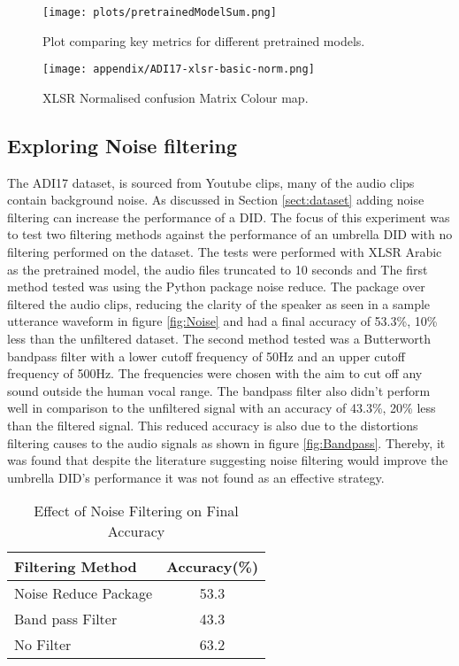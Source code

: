     \begin{figure}[h!]
        \centering
        \texttt{[image: plots/pretrainedModelSum.png]}
        \caption{Plot comparing key metrics for different pretrained models.}
        \label{fig:pretrainsum}
    \end{figure}

    \begin{figure}[h!]
        \centering
        \texttt{[image: appendix/ADI17-xlsr-basic-norm.png]}
        \caption{XLSR Normalised confusion Matrix Colour map.}
        \label{fig:xlsrcolourmap}
    \end{figure}

\pagebreak 
\subsection{Exploring Noise filtering}\label{sect:noiseExp}
The ADI17 dataset, is sourced from Youtube clips, many of the audio clips contain background noise. As discussed in 
Section \ref{sect:dataset} adding noise filtering can increase the performance of a DID. The focus of this experiment was 
to test two filtering methods against the performance of an umbrella DID with no filtering performed on the dataset. The 
tests were performed with XLSR Arabic as the pretrained model, the audio files truncated to 10 seconds and 
The first method tested was using the Python package noise reduce. The package over filtered the audio clips, reducing the clarity 
of the speaker as seen in a sample utterance waveform in figure \ref{fig:Noise} and had a final accuracy of 53.3\%, 10\% less than the unfiltered 
dataset. 
The second method tested was a Butterworth bandpass filter with a lower cutoff frequency of 50Hz and an upper cutoff frequency of 500Hz. The 
frequencies were chosen with the aim to cut off any sound outside the human vocal range. The bandpass filter also didn't perform well in comparison to the 
unfiltered signal with an accuracy of 43.3\%, 20\% less than the filtered signal. This reduced accuracy is also due to the distortions filtering causes to the 
audio signals as shown in figure \ref{fig:Bandpass}. 
Thereby, it was found that despite the literature suggesting noise filtering would improve the umbrella DID's performance it was 
not found as an effective strategy. 

\begin{table}[h!]
    \centering
    \caption{Effect of Noise Filtering on Final Accuracy}
    \begin{tabular}{|l|c|} 
    \hline
    \textbf{Filtering Method} & \textbf{Accuracy(\%)}  \\ 
    \hline
    Noise Reduce Package      & 53.3                   \\ 
    \hline
    Band pass Filter           & 43.3                   \\ 
    \hline
    No Filter                 & 63.2                   \\
    \hline
    \end{tabular}
    \end{table}

